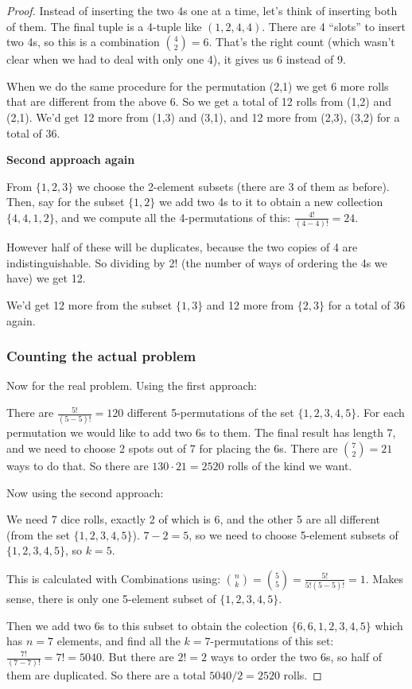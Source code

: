 \documentclass[14pt]{extarticle}
\begin{document}
\begin{proof}
Instead of inserting the two 4s one at a time, let's think of inserting both of them. The final tuple is a 4-tuple like $(1,2,4,4)$. There are 4 ``slots'' to insert two 4s, so this is a combination $\binom{4}{2} = 6$. That's the right count (which wasn't clear when we had to deal with only one 4), it gives us 6 instead of 9.

When we do the same procedure for the permutation (2,1) we get 6 more rolls that are different from the above 6. So we get a total of 12 rolls from (1,2) and (2,1). We'd get 12 more from (1,3) and (3,1), and 12 more from (2,3), (3,2) for a total of 36.

{\bf Second approach again}

From $\{1,2,3\}$ we choose the 2-element subsets (there are 3 of them as before). Then, say for the subset $\{1,2\}$ we add two 4s to it to obtain a new collection $\{4,4,1,2\}$, and we compute all the 4-permutations of this: $\frac{4!}{(4-4)!} = 24$. 

However half of these will be duplicates, because the two copies of 4 are indistinguishable. So dividing by 2! (the number of ways of ordering the 4s we have) we get 12.

We'd get 12 more from the subset $\{1,3\}$ and 12 more from $\{2,3\}$ for a total of 36 again.

\subsubsection{Counting the actual problem}
Now for the real problem. Using the first approach:

There are $\frac{5!}{(5-5)!} = 120$ different 5-permutations of the set $\{1,2,3,4,5\}$. For each permutation we would like to add two 6s to them. The final result has length 7, and we need to choose 2 spots out of 7 for placing the 6s. There are $\binom{7}{2} = 21$ ways to do that. So there are $130 \cdot 21 = 2520$ rolls of the kind we want.

Now using the second approach:

We need 7 dice rolls, exactly 2 of which is 6, and the other 5 are all different (from the set $\{1,2,3,4,5\}$). $7-2 = 5$, so we need to choose 5-element subsets of $\{1,2,3,4,5\}$, so $k = 5$. 

This is calculated with Combinations using: $\binom{n}{k} = \binom{5}{5} = \frac{5!}{5!(5-5)!} = 1$. Makes sense, there is only one 5-element subset of $\{1,2,3,4,5\}$.

Then we add two 6s to this subset to obtain the colection $\{6,6,1,2,3,4,5\}$ which has $n = 7$ elements, and find all the $k = 7$-permutations of this set: $\frac{7!}{(7-7)!} = 7! = 5040$. But there are $2! = 2$ ways to order the two 6s, so half of them are duplicated. So there are a total $5040/2 = 2520$ rolls.


\end{proof}
\end{document}
